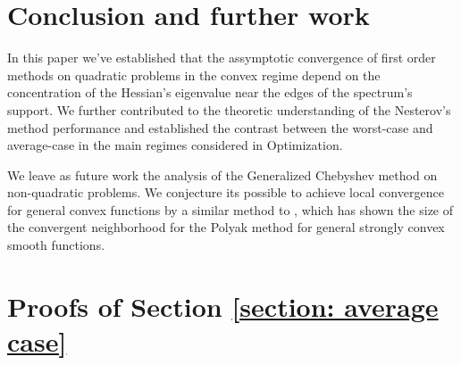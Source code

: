 \documentclass{article}
\begin{document}


\section{Conclusion and further work}
In this paper we've established that the assymptotic convergence of first order methods on quadratic problems in the convex regime depend on the concentration of the Hessian's eigenvalue near the edges of the spectrum's support. We further contributed to the theoretic understanding of the Nesterov's method performance and established the contrast between the worst-case and average-case in the main regimes considered in Optimization.

We leave as future work the analysis of the Generalized Chebyshev method on non-quadratic problems. We conjecture its possible to achieve local convergence for general convex functions by a similar method to \cite{wang2021modular}, which has shown the size of the convergent neighborhood for the Polyak method for general strongly convex smooth functions.
\newpage



\appendix
\newpage
\section{Proofs of Section \ref{section: average case}}
\end{document}
